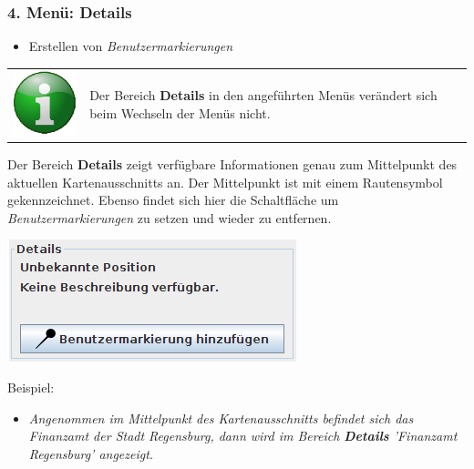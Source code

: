 \documentclass[10pt]{scrreprt}
\newcommand{\textref}[1]{\mbox{\raisebox{0.1ex}{\small$\rightarrow$ }\textit{#1}}}
\begin{document}
\vspace{5mm}
\subsubsection{4. Menü: Details}   

\begin{itemize}
\item Erstellen von \textref{Benutzermarkierungen}
\end{itemize}


\vspace{3mm}
\begin{tabular}{>{\centering \arraybackslash}m{1cm} m{14cm}} \index{Menüführung!Menü Details} \index{Menü Details}
\includegraphics[scale=0.5]{images/info.eps} & Der Bereich \textbf{Details} in den angeführten Menüs verändert sich beim Wechseln der Menüs nicht.
\end{tabular}

\vspace{5mm}
\begin{minipage}[t]{9cm}
\vspace{-10mm}
Der Bereich \textbf{Details} zeigt verfügbare Informationen genau zum Mittelpunkt des aktuellen Kartenausschnitts an. Der Mittelpunkt ist mit einem Rautensymbol gekennzeichnet. Ebenso findet sich hier die Schaltfläche um \textref{Benutzermarkierungen} zu setzen und wieder zu entfernen. \\
\end{minipage}
\begin{minipage}{7cm}
\centering
\includegraphics[scale=0.4]{images/details_menu.png}
\end{minipage}

\vspace{3mm}
Beispiel:
\begin{itemize}
\item \textit{Angenommen im Mittelpunkt des Kartenausschnitts befindet sich das Finanzamt der Stadt Regensburg, dann wird im Bereich \textbf{Details} 'Finanzamt Regensburg' angezeigt.}
\end{itemize}
\end{document}
